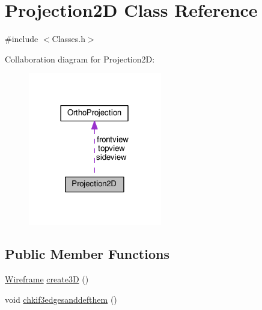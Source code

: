 \hypertarget{class_projection2_d}{}\section{Projection2D Class Reference}
\label{class_projection2_d}


{\ttfamily \#include $<$Classes.\+h$>$}



Collaboration diagram for Projection2D\+:\nopagebreak
\begin{figure}[H]
\begin{center}
\leavevmode
\includegraphics[width=165pt]{class_projection2_d__coll__graph}
\end{center}
\end{figure}
\subsection*{Public Member Functions}
\begin{DoxyCompactItemize}
\item 
\hyperlink{class_wireframe}{Wireframe} \hyperlink{class_projection2_d_aa061602930f19acad32720f7067c58fa}{create3D} ()
\item 
void \hyperlink{class_projection2_d_a64751fc8527786d489d3e1f9dd613778}{chkif3edgesanddefthem} ()
\end{DoxyCompactItemize}
